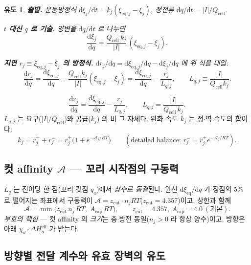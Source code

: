 \documentclass[11pt,a4paper]{article}
\newtheorem*{derivebox}{유도}
\newcommand{\dd}{\mathrm{d}}
\newcommand{\eff}{\mathrm{eff}}
\newcommand{\eq}{\mathrm{eq}}
\newcommand{\cell}{\mathrm{cell}}
\begin{document}
\begin{derivebox}
\textbf{출발.} 운동방정식 $\dd\xi_j/\dd t=k_j(\xi_{\eq,j}-\xi_j)$, 정전류 $\dd q/\dd t=|I|/Q_\cell$.

\textbf{$t$ 대신 $q$ 로 기술.} 양변을 $\dd q/\dd t$ 로 나누면
\begin{equation*}
\frac{\dd\xi_j}{\dd q}=\frac{Q_\cell\,k_j}{|I|}\,(\xi_{\eq,j}-\xi_j).
\end{equation*}

\textbf{지연 $r_j\equiv\xi_{\eq,j}-\xi_j$ 의 방정식.} $\dd r_j/\dd q=\dd\xi_{\eq,j}/\dd q-\dd\xi_j/\dd q$ 에 위 식을 대입:
\begin{equation*}
\frac{\dd r_j}{\dd q}=\frac{\dd\xi_{\eq,j}}{\dd q}-\frac{Q_\cell k_j}{|I|}(\xi_{\eq,j}-\xi_j)
=\frac{\dd\xi_{\eq,j}}{\dd q}-\frac{r_j}{L_{q,j}},
\qquad L_{q,j}\equiv\frac{|I|}{Q_\cell k_j}.
\end{equation*}
\end{derivebox}
\begin{equation}
\frac{\dd r_j}{\dd q}=\frac{\dd\xi_{\eq,j}}{\dd q}-\frac{r_j}{L_{q,j}},
\qquad L_{q,j}=\frac{|I|}{Q_\cell\,k_j}.
\label{eq:Lq}
\end{equation}
$L_{q,j}$ 는 요구($|I|/Q_\cell$)와 공급($k_j$) 의 비 그 자체다. 완화 속도 $k_j$ 는 정$\cdot$역 속도의 합이다:
\begin{equation}
k_j=r_j^++r_j^-=r_j^+\big(1+e^{-\mathcal A_j/RT}\big)\qquad(\text{detailed balance: }r_j^-=r_j^+e^{-\mathcal A_j/RT}).
\label{eq:kuniv}
\end{equation}

\subsection{컷 affinity $\mathcal A$ — 꼬리 시작점의 구동력}

$L_q$ 는 전이당 한 점(꼬리 컷점 $q_a$)에서 \emph{상수로 동결}된다. 원천 $\dd\xi_\eq/\dd q$ 가 정점의 $5\%$ 로 떨어지는
좌표에서 구동력이 $\mathcal A=z_\mathrm{cut}\cdot n_jRT$($z_\mathrm{cut}=4.357$)이고, 상한과 함께
\begin{equation}
\mathcal A=\min\!\big(z_\mathrm{cut}\,n_j\,RT,\;A_\mathrm{cap}\,RT\big),
\qquad z_\mathrm{cut}=4.357,\ A_\mathrm{cap}=4.0\ (\text{기본}).
\label{eq:Acut}
\end{equation}
\emph{부호의 핵심} — 컷 affinity 의 \emph{크기}는 충$\cdot$방전 동일($n_j>0$ 라 항상 양수)이고, 방향은 아래 $\chi_d\cdot\Delta H_a^\eff$ 가 받는다.

\subsection{방향별 전달 계수와 유효 장벽의 유도}
\end{document}
